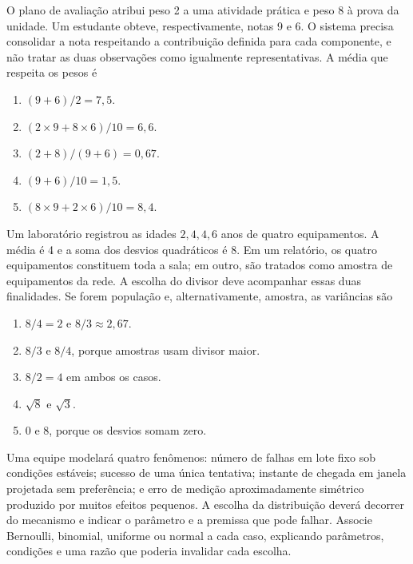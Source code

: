 \TextoBase O plano de avaliação atribui peso 2 a uma atividade prática e peso 8 à prova da unidade. Um estudante obteve, respectivamente, notas 9 e 6. O sistema precisa consolidar a nota respeitando a contribuição definida para cada componente, e não tratar as duas observações como igualmente representativas.
\FonteDidatica
\Comando A média que respeita os pesos é
\begin{enumerate}[label=\Alph*)]\item $(9+6)/2=7{,}5$.\item $(2\times9+8\times6)/10=6{,}6$.\item $(2+8)/(9+6)=0{,}67$.\item $(9+6)/10=1{,}5$.\item $(8\times9+2\times6)/10=8{,}4$.\end{enumerate}

\TextoBase Um laboratório registrou as idades $2,4,4,6$ anos de quatro equipamentos. A média é 4 e a soma dos desvios quadráticos é 8. Em um relatório, os quatro equipamentos constituem toda a sala; em outro, são tratados como amostra de equipamentos da rede. A escolha do divisor deve acompanhar essas duas finalidades.
\FonteDidatica
\Comando Se forem população e, alternativamente, amostra, as variâncias são
\begin{enumerate}[label=\Alph*)]\item $8/4=2$ e $8/3\approx2{,}67$.\item $8/3$ e $8/4$, porque amostras usam divisor maior.\item $8/2=4$ em ambos os casos.\item $\sqrt8$ e $\sqrt3$.\item 0 e 8, porque os desvios somam zero.\end{enumerate}

\TextoBase Uma equipe modelará quatro fenômenos: número de falhas em lote fixo sob condições estáveis; sucesso de uma única tentativa; instante de chegada em janela projetada sem preferência; e erro de medição aproximadamente simétrico produzido por muitos efeitos pequenos. A escolha da distribuição deverá decorrer do mecanismo e indicar o parâmetro e a premissa que pode falhar.
\FonteDidatica
\Comando Associe Bernoulli, binomial, uniforme ou normal a cada caso, explicando parâmetros, condições e uma razão que poderia invalidar cada escolha.

